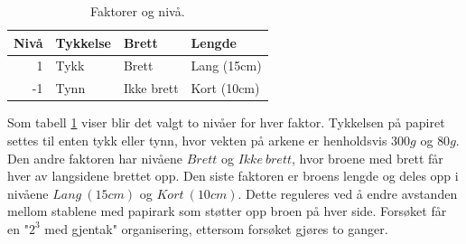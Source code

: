 \documentclass[12pt]{article}
\begin{document}
\begin{table}[H]
  \centering
  \caption{Faktorer og nivå.}
    \begin{tabular}{rlll}
    \toprule
    \multicolumn{1}{l}{\textbf{Nivå}} & \textbf{Tykkelse} & \textbf{Brett} & \textbf{Lengde} \\
    \midrule
    1     & Tykk  & Brett & Lang (15cm) \\
    -1    & Tynn  & Ikke brett & Kort (10cm) \\
    \bottomrule
    \end{tabular}%
  \label{tab:tab1}%
\end{table}%

Som tabell \ref{tab:tab1} viser blir det valgt to nivåer for hver faktor. Tykkelsen på papiret settes til enten tykk eller tynn, hvor vekten på arkene er henholdsvis $300g$ og $80g$. Den andre faktoren har nivåene $Brett$ og $Ikke\ brett$, hvor broene med brett får hver av langsidene brettet opp. Den siste faktoren er broens lengde og deles opp i nivåene $Lang\ (15cm)$ og $Kort\ (10cm)$. Dette reguleres ved å endre avstanden mellom stablene med papirark som støtter opp broen på hver side. Forsøket får en "$2^3$ med gjentak" organisering, ettersom forsøket gjøres to ganger.
\end{document}

